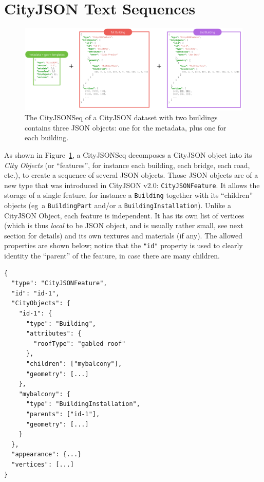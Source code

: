 \documentclass{isprs} %
\newcommand{\eg}{eg}
\begin{document}
%
\section{CityJSON Text Sequences}%
\label{sec:cityjsonseq}

\begin{figure}[h]
  \centering
  \includegraphics[width=0.95\linewidth]{figs/cjseq_idea}
  \caption{The CityJSONSeq of a CityJSON dataset with two buildings contains three JSON objects: one for the metadata, plus one for each building.}%
\label{fig:cjseq_idea}
\end{figure}

As shown in Figure~\ref{fig:cjseq_idea}, a CityJSONSeq decomposes a CityJSON object into its \emph{City Objects} (or ``features'', for instance each building, each bridge, each road, etc.), to create a sequence of several JSON objects.
Those JSON objects are of a new type that was introduced in CityJSON v2.0: \texttt{CityJSONFeature}.
It allows the storage of a single feature, for instance a \texttt{Building} together with its ``children'' objects (\eg\ a \texttt{BuildingPart} and/or a \texttt{BuildingInstallation}). 
Unlike a CityJSON Object, each feature is independent. 
It has its own list of vertices (which is thus \emph{local} to be JSON object, and is usually rather small, see next section for details) and its own textures and materials (if any).
The allowed properties are shown below; notice that the \texttt{"id"} property is used to clearly identity the ``parent'' of the feature, in case there are many children.
\begin{lstlisting}
{
  "type": "CityJSONFeature",
  "id": "id-1", 
  "CityObjects": {
    "id-1": {
      "type": "Building", 
      "attributes": { 
        "roofType": "gabled roof"
      },
      "children": ["mybalcony"],
      "geometry": [...]
    },
    "mybalcony": {
      "type": "BuildingInstallation", 
      "parents": ["id-1"],
      "geometry": [...]
    }
  },
  "appearance": {...}
  "vertices": [...]
}
\end{lstlisting}
\end{document}
